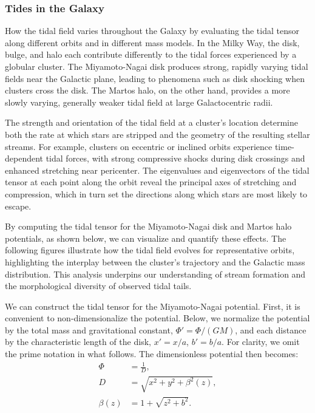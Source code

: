        \subsubsection*{Tides in the Galaxy}
            
            How the tidal field varies throughout the Galaxy by evaluating the tidal tensor along different orbits and in different mass models. In the Milky Way, the disk, bulge, and halo each contribute differently to the tidal forces experienced by a globular cluster. The Miyamoto-Nagai disk produces strong, rapidly varying tidal fields near the Galactic plane, leading to phenomena such as disk shocking when clusters cross the disk. The Martos halo, on the other hand, provides a more slowly varying, generally weaker tidal field at large Galactocentric radii.

            The strength and orientation of the tidal field at a cluster's location determine both the rate at which stars are stripped and the geometry of the resulting stellar streams. For example, clusters on eccentric or inclined orbits experience time-dependent tidal forces, with strong compressive shocks during disk crossings and enhanced stretching near pericenter. The eigenvalues and eigenvectors of the tidal tensor at each point along the orbit reveal the principal axes of stretching and compression, which in turn set the directions along which stars are most likely to escape.

            By computing the tidal tensor for the Miyamoto-Nagai disk and Martos halo potentials, as shown below, we can visualize and quantify these effects. The following figures illustrate how the tidal field evolves for representative orbits, highlighting the interplay between the cluster's trajectory and the Galactic mass distribution. This analysis underpins our understanding of stream formation and the morphological diversity of observed tidal tails.

            We can construct the tidal tensor for the Miyamoto-Nagai potential. First, it is convenient to non-dimensionalize the potential. Below, we normalize the potential by the total mass and gravitational constant, $\Phi\prime = \Phi / (GM)$, and each distance by the characteristic length of the disk, $x\prime = x/a$, $b\prime = b/a$. For clarity, we omit the prime notation in what follows. The dimensionless potential then becomes:            
            \begin{eqnarray}
                \Phi   &= \frac{1}{D},\\
                D       &= \sqrt{x^2 + y^2 + \beta^2(z)},\\
                \beta(z)   &= 1 + \sqrt{z^2 + b^2}.
            \end{eqnarray}
            
